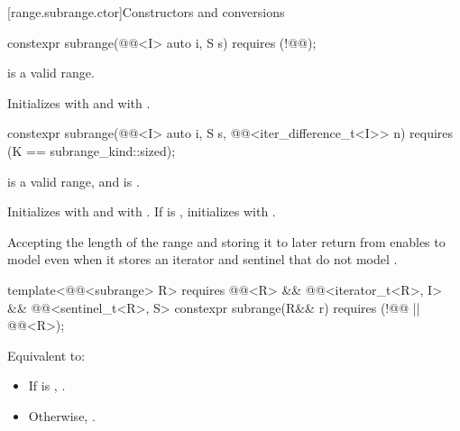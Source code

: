 [range.subrange.ctor]{Constructors and conversions}

%
\begin{itemdecl}
constexpr subrange(@@<I> auto i, S s) requires (!@@);
\end{itemdecl}

\begin{itemdescr}
\pnum
\expects
{} is a valid range.

\pnum
\effects
Initializes  with  and  with
.
\end{itemdescr}

%
\begin{itemdecl}
constexpr subrange(@@<I> auto i, S s,
                   @@<iter_difference_t<I>> n)
  requires (K == subrange_kind::sized);
\end{itemdecl}

\begin{itemdescr}
\pnum
\expects
{} is a valid range, and
is .

\pnum
\effects
Initializes  with  and  with
. If  is , initializes  with
.

\pnum
\begin{note}
Accepting the length of the range and storing it to later return  from
 enables  to model  even
when it stores an iterator and sentinel that do not model
.
\end{note}
\end{itemdescr}

%
\begin{itemdecl}
template<@@<subrange> R>
  requires @@<R> &&
           @@<iterator_t<R>, I> &&
           @@<sentinel_t<R>, S>
constexpr subrange(R&& r) requires (!@@ || @@<R>);
\end{itemdecl}

\begin{itemdescr}
\pnum
\effects
Equivalent to:
\begin{itemize}
\item If  is ,
.
\item Otherwise, .
\end{itemize}
\end{itemdescr}

